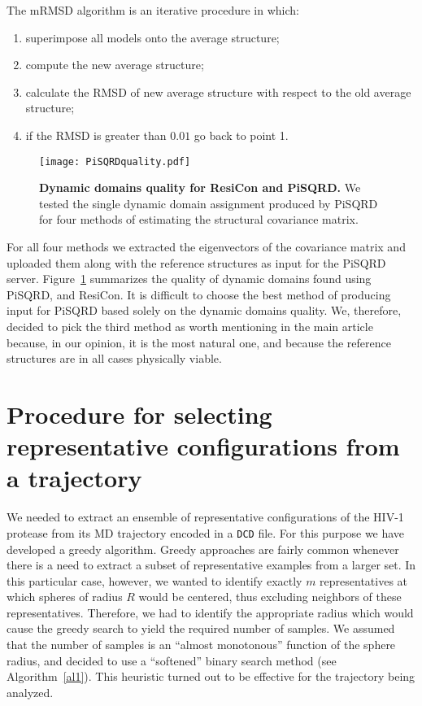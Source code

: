 \documentclass[a4paper,11pt,twoside]{book}%
\begin{document}
\begin{appendices}
The mRMSD algorithm is an iterative procedure in which: 
\begin{enumerate}
 \item superimpose all models onto the average structure;
 \item compute the new average structure;
 \item calculate the RMSD of new average structure with respect to the old average structure;
 \item if the RMSD is greater than $0.01$ go back to point 1.
\end{enumerate}

\begin{figure}[h!]
 \texttt{[image: PiSQRDquality.pdf]}
\caption{
{\bf Dynamic domains quality for ResiCon and PiSQRD.}
We tested the single dynamic domain assignment produced by PiSQRD for four methods of estimating the structural covariance matrix.
}
\label{boxPlot}
\end{figure}

For all four methods we extracted the eigenvectors of the covariance matrix and uploaded them along with the reference structures as input for the PiSQRD server.
Figure~\ref{boxPlot} summarizes the quality of dynamic domains found using PiSQRD, and ResiCon.
It is difficult to choose the best method of producing input for PiSQRD based solely on the dynamic domains quality.
We, therefore, decided to pick the third method as worth mentioning in the main article because, in our opinion, it is the most natural one, and because the reference structures are in all cases physically viable.





\section{Procedure for selecting representative configurations from a trajectory}
We needed to extract an ensemble of representative configurations of the HIV-1 protease from its MD trajectory encoded in a \texttt{DCD} file.
For this purpose we have developed a greedy algorithm.
Greedy approaches are fairly common whenever there is a need to extract a subset of representative examples from a larger set.
In this particular case, however, we wanted to identify exactly $m$ representatives at which spheres of radius $R$ would be centered, thus excluding neighbors of these representatives.
Therefore, we had to identify the appropriate radius which would cause the greedy search to yield the required number of samples.
We assumed that the number of samples is an ``almost monotonous'' function of the sphere radius, and decided to use a ``softened'' binary search method (see Algorithm~\ref{al1}).
This heuristic turned out to be effective for the trajectory being analyzed.


\end{appendices}
\end{document}
